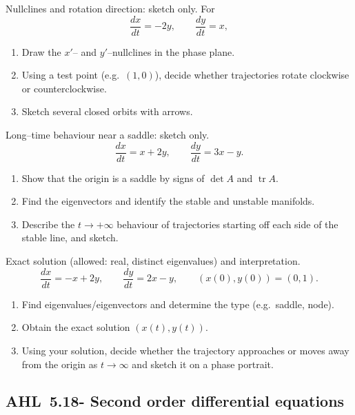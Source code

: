 \documentclass[11pt]{article}
\def\textbf#1{#1}%
\newcommand{\tocsubsection}[1]{\subsection{#1}}
\newcounter{question}
\begin{document}
\begin{question}
\textbf{Nullclines and rotation direction: sketch only.}
For
\[
\frac{dx}{dt}=-2y,\qquad \frac{dy}{dt}=x,
\]
\begin{enumerate}
  \item Draw the $x'$– and $y'$–nullclines in the phase plane.
  \item Using a test point (e.g.\ $(1,0)$), decide whether trajectories rotate clockwise or counterclockwise.
  \item Sketch several closed orbits with arrows.
\end{enumerate}
\end{question}

\begin{question}
\textbf{Long–time behaviour near a saddle: sketch only.}
\[
\frac{dx}{dt}=x+2y,\qquad \frac{dy}{dt}=3x-y.
\]
\begin{enumerate}
  \item Show that the origin is a saddle by signs of $\det A$ and $\operatorname{tr}A$.
  \item Find the eigenvectors and identify the stable and unstable manifolds.
  \item Describe the $t\to+\infty$ behaviour of trajectories starting off each side of the stable line, and sketch.
\end{enumerate}
\end{question}

\begin{question}
\textbf{Exact solution (allowed: real, distinct eigenvalues) and interpretation.}
\[
\frac{dx}{dt}=-x+2y,\qquad \frac{dy}{dt}=2x-y,\qquad (x(0),y(0))=(0,1).
\]
\begin{enumerate}
  \item Find eigenvalues/eigenvectors and determine the type (e.g.\ saddle, node).
  \item Obtain the exact solution $(x(t),y(t))$.
  \item Using your solution, decide whether the trajectory approaches or moves away from the origin as $t\to\infty$ and sketch it on a phase portrait.
\end{enumerate}
\end{question}




\tocsubsection{AHL 5.18- Second order differential equations}
\end{document}
